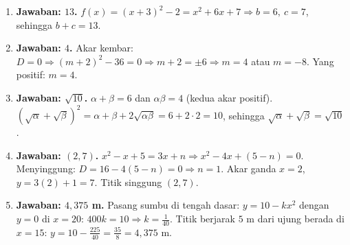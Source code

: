 \documentclass[a4paper,11pt]{article}
\newcommand{\dis}{\displaystyle}
\newcounter{no}
\begin{document}
\small\begin{enumerate}[leftmargin=2em,itemsep=2pt,topsep=2pt]
\item[\textbf{1.}] \textbf{Jawaban: $13$.} $f(x)=(x+3)^{2}-2=x^{2}+6x+7\Rightarrow b=6,\ c=7$, sehingga $b+c=13$.
\item[\textbf{2.}] \textbf{Jawaban: $4$.} Akar kembar: $D=0\Rightarrow(m+2)^{2}-36=0\Rightarrow m+2=\pm6\Rightarrow m=4$ atau $m=-8$. Yang positif: $m=4$.
\item[\textbf{3.}] \textbf{Jawaban: $\sqrt{10}$.} $\alpha+\beta=6$ dan $\alpha\beta=4$ (kedua akar positif). $\left(\sqrt\alpha+\sqrt\beta\right)^{2}=\alpha+\beta+2\sqrt{\alpha\beta}=6+2\cdot2=10$, sehingga $\sqrt\alpha+\sqrt\beta=\sqrt{10}$.
\item[\textbf{4.}] \textbf{Jawaban: $(2,7)$.} $x^{2}-x+5=3x+n\Rightarrow x^{2}-4x+(5-n)=0$. Menyinggung: $D=16-4(5-n)=0\Rightarrow n=1$. Akar ganda $x=2$, $y=3(2)+1=7$. Titik singgung $(2,7)$.
\item[\textbf{5.}] \textbf{Jawaban: $4{,}375$ m.} Pasang sumbu di tengah dasar: $y=10-kx^{2}$ dengan $y=0$ di $x=20$: $400k=10\Rightarrow k=\dis\frac1{40}$. Titik berjarak $5$ m dari ujung berada di $x=15$: $y=10-\dis\frac{225}{40}=\dis\frac{35}{8}=4{,}375$ m.
\end{enumerate}
\par{}\par\vspace{0.2em}
\end{document}
